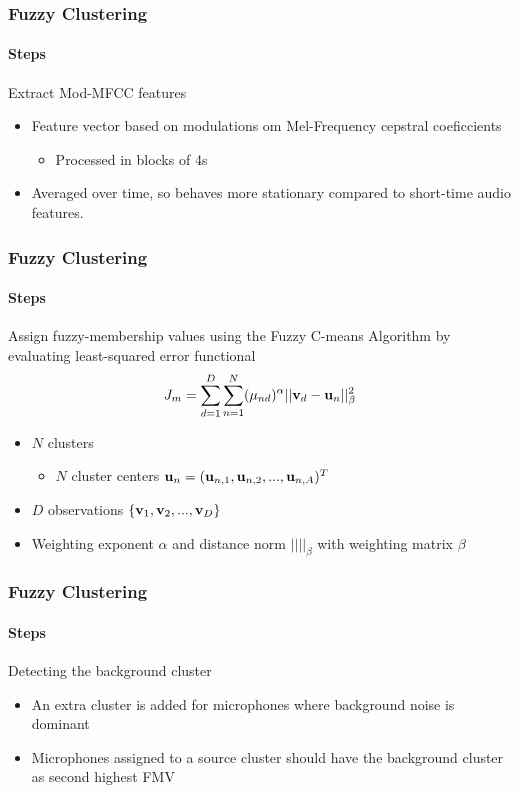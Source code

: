 \documentclass[aspectratio=169]{beamer}
\begin{document}
\begin{frame}
    \frametitle{Fuzzy Clustering}
    \framesubtitle{Steps}
    Extract Mod-MFCC features
     \begin{itemize}
        \item Feature vector based on modulations om Mel-Frequency cepstral
        coeficcients
        \begin{itemize}
            \item Processed in blocks of 4s
           
        \end{itemize}
        \item Averaged over time, so behaves more stationary compared to short-time audio features.
           
    \end{itemize}

\end{frame}
\begin{frame}
    \frametitle{Fuzzy Clustering}
    \framesubtitle{Steps}
    Assign fuzzy-membership values using the Fuzzy C-means Algorithm by evaluating least-squared error functional
    \begin{equation*}
        J_m = \sum_{d=1}^D \sum_{n=1}^N (\mu_{nd})^{\alpha} \vert \vert \bold v_d - \bold u_n \vert \vert ^2_{\beta}
    \end{equation*}
      \begin{itemize}
        \item $N$ clusters
        \begin{itemize}
            \item $N$ cluster centers $ \bold u_n =( \bold u_{n,1}, \bold u_{n,2},...,\bold u_{n,A})^T $
        \end{itemize}
        \item $D$ observations $ \{\bold v_1, \bold v_2,..., \bold v_D\} $
        
        \item Weighting exponent $\alpha$ and distance norm $\vert \vert \vert \vert _{\beta}$ with weighting matrix $\beta$
        
    \end{itemize}
  

\end{frame}

\begin{frame}
    \frametitle{Fuzzy Clustering}
    \framesubtitle{Steps}
    Detecting the background cluster
    
     \begin{itemize}
    \item An extra cluster is added for microphones where background noise is dominant
    \item Microphones assigned to a source cluster should have the background  cluster as second highest FMV
        
    \end{itemize}
        
        
  

\end{frame}
\end{document}
